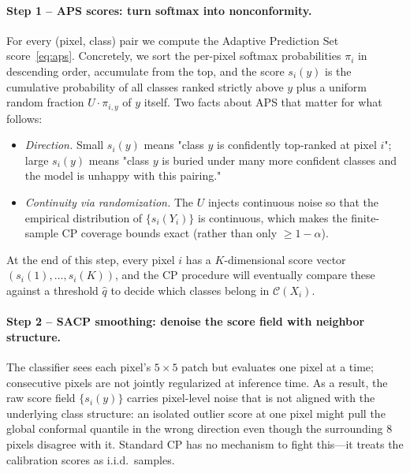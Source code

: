 \documentclass[11pt]{article}
\newcommand{\1}{\mathbf{1}}
\begin{document}
\paragraph{Step 1 -- APS scores: turn softmax into nonconformity.}
For every (pixel, class) pair we compute the Adaptive Prediction Set score~\eqref{eq:aps}. Concretely, we sort the per-pixel softmax probabilities $\pi_i$ in descending order, accumulate from the top, and the score $s_i(y)$ is the cumulative probability of all classes ranked strictly above $y$ plus a uniform random fraction $U \cdot \pi_{i,y}$ of $y$ itself. Two facts about APS that matter for what follows:
\begin{itemize}[topsep=2pt,itemsep=2pt,leftmargin=1.5em]
    \item \emph{Direction.} Small $s_i(y)$ means "class $y$ is confidently top-ranked at pixel $i$"; large $s_i(y)$ means "class $y$ is buried under many more confident classes and the model is unhappy with this pairing."
    \item \emph{Continuity via randomization.} The $U$ injects continuous noise so that the empirical distribution of $\{s_i(Y_i)\}$ is continuous, which makes the finite-sample CP coverage bounds exact (rather than only $\ge 1 - \alpha$).
\end{itemize}
At the end of this step, every pixel $i$ has a $K$-dimensional score vector $(s_i(1), \ldots, s_i(K))$, and the CP procedure will eventually compare these against a threshold $\hat q$ to decide which classes belong in $\mathcal{C}(X_i)$.

\paragraph{Step 2 -- SACP smoothing: denoise the score field with neighbor structure.}
The classifier sees each pixel's $5\times5$ patch but evaluates one pixel at a time; consecutive pixels are not jointly regularized at inference time. As a result, the raw score field $\{s_i(y)\}$ carries pixel-level noise that is not aligned with the underlying class structure: an isolated outlier score at one pixel might pull the global conformal quantile in the wrong direction even though the surrounding 8 pixels disagree with it. Standard CP has no mechanism to fight this---it treats the calibration scores as i.i.d.\ samples.
\end{document}
